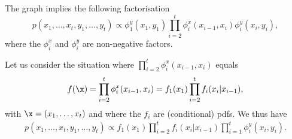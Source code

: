 The graph implies the following factorisation
\begin{equation}
  p( x_1, \ldots, x_t,y_1, \ldots, y_t) \propto \phi_1^y(x_1, y_1) \prod_{i=2}^t \phi_i^x(x_{i-1}, x_i) \phi_i^y(x_i, y_i),
\end{equation}
where  the $\phi_i^x$ and $\phi_i^y$ are non-negative factors.

Let us consider the situation where $\prod_{i=2}^t \phi^x_i(x_{i-1}, x_i)$ equals
\begin{equation}
  f(\x) = \prod_{i=2}^t \phi^x_i(x_{i-1}, x_i) = f_1(x_1) \prod_{i=2}^t f_i(x_i|x_{i-1}),
\end{equation}
with $\x=(x_1, \ldots, x_t)$ and where the $f_i$ are (conditional) pdfs. We thus have
\begin{align}
  p(x_1, \ldots, x_t, y_1, \ldots, y_t) \propto f_1(x_1) \prod_{i=2}^t f_i(x_i|x_{i-1}) \prod_{i=1}^t \phi_i^y(x_i, y_i).
  \label{eq:Markov-model-joint-def}
\end{align}


